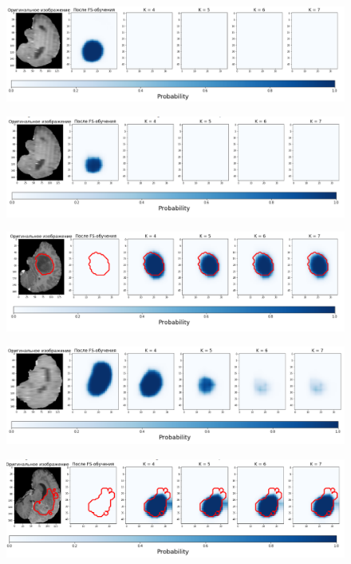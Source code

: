   \begin{figure}[h!] 
  \center
  \includegraphics [scale=0.7] {images/good_18.png}
  \end{figure} 
  
  \begin{figure}[h!] 
  \center
  \includegraphics [scale=0.7] {images/good_19.png}
\end{figure}


  \begin{figure}[h!] 
  \center
  \includegraphics [scale=0.7] {images/good_20.png}
\end{figure}

  \begin{figure}[h!] 
  \center
  \includegraphics [scale=0.7] {images/good_21.png}
  \end{figure} 
  
  \begin{figure}[h!] 
  \center
  \includegraphics [scale=0.7] {images/good_22.png}
\end{figure}



\clearpage
